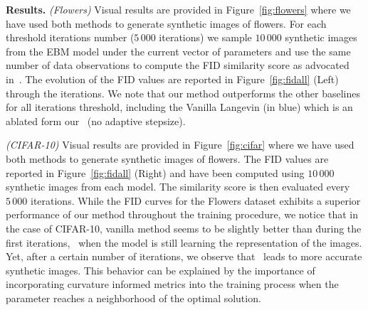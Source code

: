 \documentclass[letterpaper]{article} %
\begin{document}
\medskip
\textbf{Results.} 
\textit{(Flowers)} \hspace{0.05in} Visual results are provided in Figure~\ref{fig:flowers} where we have used both methods to generate synthetic images of flowers.
For each threshold iterations number ($5\,000$ iterations) we sample $10\,000$ synthetic images from the EBM model under the current vector of parameters and use the same number of data observations to compute the FID similarity score as advocated in~\citet{heusel2017gans}.
The evolution of the FID values are reported in Figure~\ref{fig:fidall} (Left) through the iterations.
We note that our method outperforms the other baselines for all iterations threshold, including the Vanilla Langevin (in blue) which is an ablated form our \algo\ (no adaptive stepsize).



\newpage

\textit{(CIFAR-10)} \hspace{0.05in} Visual results are provided in Figure~\ref{fig:cifar} where we have used both methods to generate synthetic images of flowers.
The FID values are reported in Figure~\ref{fig:fidall} (Right) and have been computed using $10\,000$ synthetic images from each model.
The similarity score is then evaluated every $5\,000$ iterations. 
While the FID curves for the Flowers dataset exhibits a superior performance of our method throughout the training procedure, we notice that in the case of CIFAR-10, vanilla method seems to be slightly better than \algo\. during the first iterations, \ie\ when the model is still learning the representation of the images.
Yet, after a certain number of iterations, we observe that \algo\ leads to more accurate synthetic images.
This behavior can be explained by the importance of incorporating curvature informed metrics into the training process when the parameter reaches a neighborhood of the optimal solution.
\end{document}
